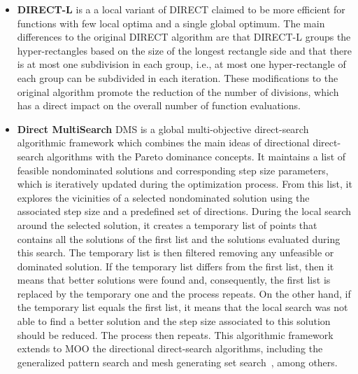 \begin{itemize}
	\item \textbf{DIRECT-L} \cite{Gablonsky2001} is a a local variant of DIRECT claimed to be more efficient for functions with few local optima and a single global optimum. The main differences to the original DIRECT algorithm are that DIRECT-L groups the hyper-rectangles based on the size of the longest rectangle side and that there is at most one subdivision in each group, i.e., at most one hyper-rectangle of each group can be subdivided in each iteration. These modifications to the original algorithm promote the reduction of the number of divisions, which has a direct impact on the overall number of function evaluations.
	
	\item \textbf{Direct MultiSearch} DMS \cite{Custodio2010} is a global multi-objective direct-search algorithmic framework which combines the main ideas of directional direct-search algorithms with the Pareto dominance concepts. It maintains a list of feasible nondominated solutions and corresponding step size parameters, which is iteratively updated during the optimization process. From this list, it explores the vicinities of a selected nondominated solution using the associated step size and a predefined set of directions. During the local search around the selected solution, it creates a temporary list of points that contains all the solutions of the first list and the solutions evaluated during this search. The temporary list is then filtered removing any unfeasible or dominated solution. If the temporary list differs from the first list, then it means that better solutions were found and, consequently, the first list is replaced by the temporary one and the process repeats.  On the other hand, if the temporary list equals the first list, it means that the local search was not able to find a better solution and the step size associated to this solution should be reduced. The process then repeats. This algorithmic framework extends to \ac{MOO} the directional direct-search algorithms, including the generalized pattern search and mesh generating set search~\cite{Kolda2003}, among others. 


\end{itemize}	

